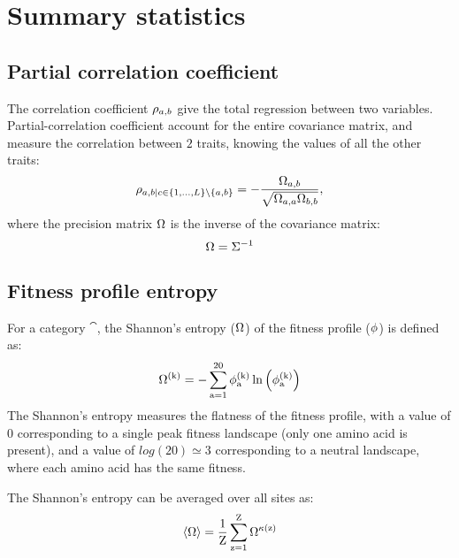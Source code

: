 \section{Summary statistics}
\label{sec:summary-statistics}

\subsection{Partial correlation coefficient}
\label{subsec:partial-correlation-coefficient}

The correlation coefficient $\rho_{a, b}$ give the total regression between two variables.
Partial-correlation coefficient account for the entire covariance matrix, and measure the correlation between $2$ traits, knowing the values of all the other traits:
\begin{equation}
    \rho_{a, b | c \in \{1, \hdots, L\} \setminus \{ a, b\} } = - \dfrac{\Omega_{a, b}}{\sqrt{\Omega_{a, a} \Omega_{b, b}}},
\end{equation}
where the precision matrix $\Omega$ is the inverse of the covariance matrix:
\begin{equation}
    \Omega = \Sigma^{-1}
\end{equation}

\subsection{Fitness profile entropy}
\label{subsec:fitness-profile-entropy}

For a category $\cat$, the Shannon's entropy (${\Omega}$) of the fitness profile ($\phi$) is defined as:
\begin{equation}
    {\Omega}^{(\text{k})} = - \sum\limits_{\text{a}=1}^{20} \phi^{(\text{k})}_{\text{a}} \ln \left( \phi^{(\text{k})}_{\text{a}} \right)
\end{equation}
The Shannon's entropy measures the flatness of the fitness profile, with a value of $0$ corresponding to a single peak fitness landscape (only one amino acid is present), and a value of $log(20)\simeq3$ corresponding to a {neutral} landscape, where each amino acid has the same fitness.

The Shannon's entropy can be averaged over all sites as:
\begin{equation}
    \left\langle {\Omega} \right\rangle = \dfrac{1}{\text{Z}}\sum\limits_{\text{z}=1}^{\text{Z}} {\Omega}^{\kappa\left(\text{z}\right)}
\end{equation}


